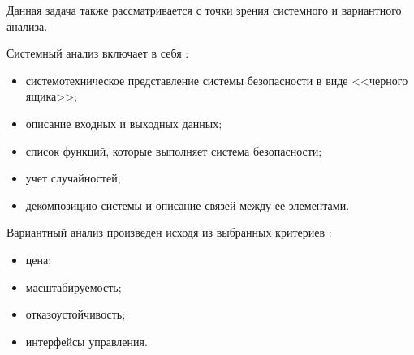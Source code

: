Данная задача также рассматривается с точки зрения системного и вариантного анализа.

Системный анализ включает в себя \cite{sys-analyz}:
\begin{itemize}
  \item системотехническое представление системы безопасности в виде <<черного ящика>>;
  \item описание входных и выходных данных;
  \item список функций, которые выполняет система безопасности;
  \item учет случайностей;
  \item декомпозицию системы и описание связей между ее элементами.
\end{itemize}

Вариантный анализ произведен исходя из выбранных критериев \cite{var-analyz}:
\begin{itemize}
  \item цена;
  \item масштабируемость;
  \item отказоустойчивость;
  \item интерфейсы управления.
\end{itemize}

\clearpage
